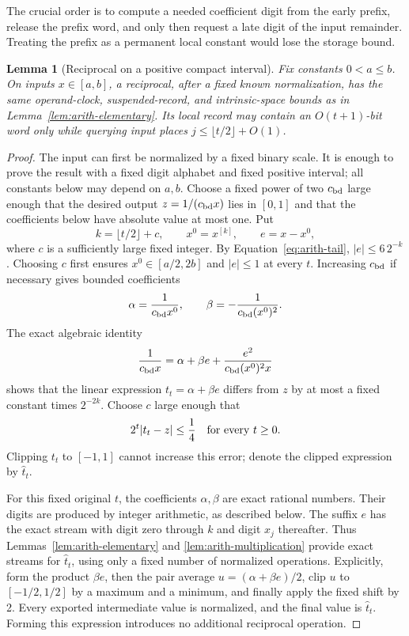 \documentclass[11pt]{article}
\numberwithin{equation}{section}
\newtheorem{lemma}[theorem]{Lemma}
\theoremstyle{definition}
\theoremstyle{remark}
\begin{document}
The crucial order is to compute a needed coefficient digit from the early prefix, release the prefix word, and only then request a late digit of the input remainder. Treating the prefix as a permanent local constant would lose the storage bound.

\begin{lemma}[Reciprocal on a positive compact interval]
\label{lem:arith-reciprocal}
Fix constants $0<a\leq b$.  On inputs $x\in[a,b]$, a reciprocal,
after a fixed known normalization, has the same operand-clock,
suspended-record, and intrinsic-space bounds as in
Lemma~\ref{lem:arith-elementary}.  Its local record may contain an
$O(t+1)$-bit word only while querying input places
$j\leq\lfloor t/2\rfloor+O(1)$.
\end{lemma}

\begin{proof}
The input can first be normalized by a fixed binary scale.  It is
enough to prove the result with a fixed digit alphabet and fixed
positive interval; all constants below may depend on $a,b$.
Choose a fixed power of two ${c_{\rm bd}}$ large enough that the desired output
$z=1/({c_{\rm bd}}x)$ lies in $[0,1]$ and that the coefficients below have
absolute value at most one.  Put
\[
 k=\lfloor t/2\rfloor+c,\qquad x^0=x^{[k]},\qquad e=x-x^0,
\]
where $c$ is a sufficiently large fixed integer.  By
Equation~\eqref{eq:arith-tail}, $|e|\leq 6\,2^{-k}$.  Choosing $c$
first ensures $x^0\in[a/2,2b]$ and $|e|\leq1$ at every $t$.
Increasing ${c_{\rm bd}}$ if necessary gives bounded coefficients
\[
 \alpha=\frac1{{c_{\rm bd}}x^0},\qquad \beta=-\frac1{{c_{\rm bd}}(x^0)^2}.
\]
The exact algebraic identity
\begin{equation}
 \frac1{{c_{\rm bd}}x}=\alpha+\beta e+
               \frac{e^2}{{c_{\rm bd}}(x^0)^2x}
 \label{eq:arith-reciprocal-taylor}
\end{equation}
shows that the linear expression ${t}_t=\alpha+\beta e$ differs
from $z$ by at most a fixed constant times $2^{-2k}$.
Choose $c$ large enough that
\begin{equation}
 2^t|{t}_t-z|\leq\frac14
 \quad\hbox{for every }t\geq0.
 \label{eq:arith-reciprocal-remainder}
\end{equation}
Clipping ${t}_t$ to $[-1,1]$ cannot increase this error; denote the
clipped expression by $\widehat {t}_t$.

For this fixed original $t$, the coefficients $\alpha,\beta$ are
exact rational numbers.  Their digits are produced by integer
arithmetic, as described below.  The suffix $e$ has the exact stream
with digit zero through $k$ and digit $x_j$ thereafter.  Thus
Lemmas~\ref{lem:arith-elementary} and
\ref{lem:arith-multiplication} provide exact streams for
$\widehat {t}_t$, using only a fixed number of normalized operations.
Explicitly, form the product $\beta e$, then the pair average
$u=(\alpha+\beta e)/2$, clip $u$ to $[-1/2,1/2]$ by a maximum
and a minimum, and finally apply the fixed shift by 2.  Every
exported intermediate value is normalized, and the final value is
$\widehat {t}_t$.  Forming this expression introduces no additional
reciprocal operation.


\end{proof}
\end{document}
